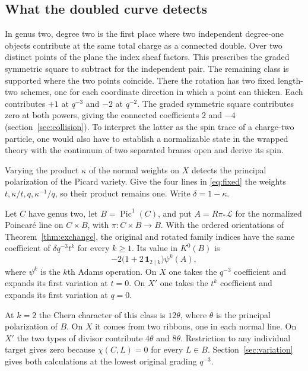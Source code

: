 \subsection{What the doubled curve detects}
In genus two, degree two is the first place where two independent
degree-one objects contribute at the same total charge as a connected
double. Over two distinct points of the plane the index sheaf factors.
This prescribes the graded symmetric square to subtract for the
independent pair. The remaining class is supported where the two
points coincide. There the rotation has two fixed length-two schemes,
one for each coordinate direction in which a point can thicken. Each
contributes $+1$ at $q^{-3}$ and $-2$ at $q^{-2}$. The graded symmetric
square contributes zero at both powers, giving the connected
coefficients $2$ and $-4$ (section~\ref{sec:collision}).
To interpret the latter as the spin trace of a charge-two particle,
one would also have to establish a normalizable state in the wrapped
theory with the continuum of two separated branes open and derive its
spin.

Varying the product $\kappa$ of the normal weights on $X$ detects
the principal polarization of the Picard variety. Give the four lines
in \eqref{eq:fixed} the weights $t,\kappa/t,q,\kappa^{-1}/q$, so their
product remains one. Write $\delta=1-\kappa$.

\begin{theorem}\label{thm:picard-variation}
Let $C$ have genus two, let $B=\operatorname{Pic}^1(C)$, and put
$A=R\pi_*\mathcal L$ for the normalized Poincar\'e line on
$C\times B$, with $\pi:C\times B\to B$. With the ordered orientations
of Theorem~\ref{thm:exchange}, the original and rotated family indices
have the same coefficient of $\delta q^{-3}t^k$ for every $k\geq1$.
Its value in $K^0(B)$ is
\[
       -2\bigl(1+2\,\mathbf1_{2\mid k}\bigr)\psi^k(A),
\]
where $\psi^k$ is the $k$th Adams operation. On $X$ one takes the
$q^{-3}$ coefficient and expands its first variation at $t=0$.
On $X'$ one takes the $t^k$ coefficient and expands its first
variation at $q=0$.
\end{theorem}

At $k=2$ the Chern character of this class is $12\theta$, where
$\theta$ is the principal polarization of $B$. On $X$ it comes from
two ribbons, one in each normal line. On $X'$ the two types of divisor
contribute $4\theta$ and $8\theta$. Restriction to any individual
target gives zero because $\chi(C,L)=0$ for every $L\in B$.
Section~\ref{sec:variation} gives both calculations at the lowest
original grading $q^{-3}$.
